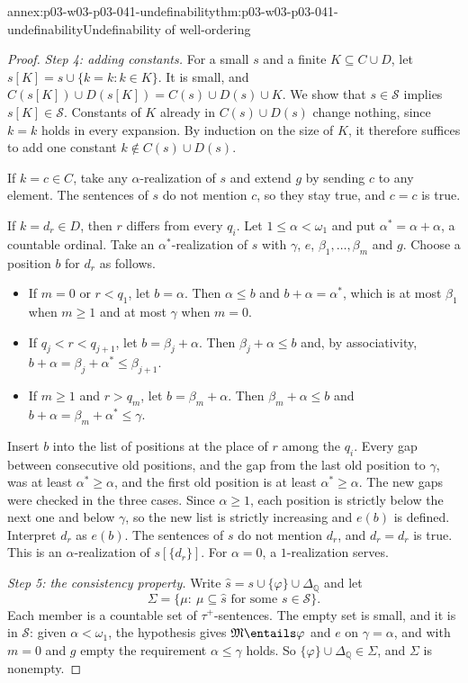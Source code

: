 \begin{annexitem}{annex:p03-w03-p03-041-undefinability}{thm:p03-w03-p03-041-undefinability}{Undefinability of well-ordering}
\begin{proof}
\emph{Step 4: adding constants.} For a small \(s\) and a finite
\(K\subseteq C\cup D\), let \(s[K]=s\cup\{k=k:k\in K\}\). It is small, and
\(C(s[K])\cup D(s[K])=C(s)\cup D(s)\cup K\). We show that
\(s\in\mathcal S\) implies \(s[K]\in\mathcal S\). Constants of \(K\)
already in \(C(s)\cup D(s)\) change nothing, since \(k=k\) holds in every
expansion. By induction on the size of \(K\), it therefore suffices to add
one constant \(k\notin C(s)\cup D(s)\).

If \(k=c\in C\), take any \(\alpha\)-realization of \(s\) and extend
\(g\) by sending \(c\) to any element. The sentences of \(s\) do not
mention \(c\), so they stay true, and \(c=c\) is true.

If \(k=d_r\in D\), then \(r\) differs from every \(q_i\). Let
\(1\leq\alpha<\omega_1\) and put \(\alpha^{\ast}=\alpha+\alpha\), a
countable ordinal. Take an \(\alpha^{\ast}\)-realization of \(s\) with
\(\gamma\), \(e\), \(\beta_1,\ldots,\beta_m\) and \(g\). Choose a position
\(b\) for \(d_r\) as follows.
\begin{itemize}
\item If \(m=0\) or \(r<q_1\), let \(b=\alpha\). Then \(\alpha\leq b\) and
      \(b+\alpha=\alpha^{\ast}\), which is at most \(\beta_1\) when
      \(m\geq1\) and at most \(\gamma\) when \(m=0\).
\item If \(q_j<r<q_{j+1}\), let \(b=\beta_j+\alpha\). Then
      \(\beta_j+\alpha\leq b\) and, by associativity,
      \(b+\alpha=\beta_j+\alpha^{\ast}\leq\beta_{j+1}\).
\item If \(m\geq1\) and \(r>q_m\), let \(b=\beta_m+\alpha\). Then
      \(\beta_m+\alpha\leq b\) and
      \(b+\alpha=\beta_m+\alpha^{\ast}\leq\gamma\).
\end{itemize}
Insert \(b\) into the list of positions at the place of \(r\) among the
\(q_i\). Every gap between consecutive old positions, and the gap from the
last old position to \(\gamma\), was at least \(\alpha^{\ast}\geq\alpha\),
and the first old position is at least \(\alpha^{\ast}\geq\alpha\). The
new gaps were checked in the three cases. Since \(\alpha\geq1\), each
position is strictly below the next one and below \(\gamma\), so the new
list is strictly increasing and \(e(b)\) is defined. Interpret \(d_r\) as
\(e(b)\). The sentences of \(s\) do not mention \(d_r\), and \(d_r=d_r\)
is true. This is an \(\alpha\)-realization of \(s[\{d_r\}]\). For
\(\alpha=0\), a \(1\)-realization serves.

\emph{Step 5: the consistency property.} Write
\(\hat s=s\cup\{\varphi\}\cup\Delta_{\mathbb Q}\) and let
\[
 \Sigma=\bigl\{\mu:\ \mu\subseteq\hat s\text{ for some }s\in\mathcal S\bigr\}.
\]
Each member is a countable set of \(\tau^{+}\)-sentences. The empty set is
small, and it is in \(\mathcal S\): given \(\alpha<\omega_1\), the
hypothesis gives \(\mathfrak M\entails\varphi\) and \(e\) on
\(\gamma=\alpha\), and with \(m=0\) and \(g\) empty the requirement
\(\alpha\leq\gamma\) holds. So \(\{\varphi\}\cup\Delta_{\mathbb Q}\in
\Sigma\), and \(\Sigma\) is nonempty.


\end{proof}
\end{annexitem}
